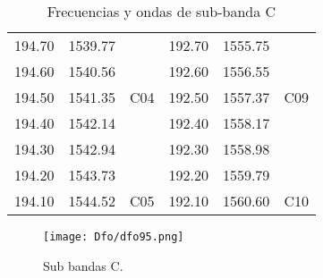 \documentclass[
	12pt, %
	fleqn, %
	a4paper, %
	oneside, %
]{LegrandOrangeBook}
\begin{document}
\begin{table}[H]
{\begin{tabular}{|ccc|ccc|}
\multicolumn{1}{|c|}{194.70}                                   & \multicolumn{1}{c|}{1539.77}                                 &                       & \multicolumn{1}{c|}{192.70}                                   & \multicolumn{1}{c|}{1555.75}                                 &                       \\ \cline{1-2} \cline{4-5}
\multicolumn{1}{|c|}{194.60}                                   & \multicolumn{1}{c|}{1540.56}                                 &                       & \multicolumn{1}{c|}{192.60}                                   & \multicolumn{1}{c|}{1556.55}                                 &                       \\ \cline{1-2} \cline{4-5}
\multicolumn{1}{|c|}{194.50}                                   & \multicolumn{1}{c|}{1541.35}                                 & \multirow{-4}{*}{C04} & \multicolumn{1}{c|}{192.50}                                   & \multicolumn{1}{c|}{1557.37}                                 & \multirow{-4}{*}{C09} \\ \hline
\multicolumn{1}{|c|}{194.40}                                   & \multicolumn{1}{c|}{1542.14}                                 &                       & \multicolumn{1}{c|}{192.40}                                   & \multicolumn{1}{c|}{1558.17}                                 &                       \\ \cline{1-2} \cline{4-5}
\multicolumn{1}{|c|}{194.30}                                   & \multicolumn{1}{c|}{1542.94}                                 &                       & \multicolumn{1}{c|}{192.30}                                   & \multicolumn{1}{c|}{1558.98}                                 &                       \\ \cline{1-2} \cline{4-5}
\multicolumn{1}{|c|}{194.20}                                   & \multicolumn{1}{c|}{1543.73}                                 &                       & \multicolumn{1}{c|}{192.20}                                   & \multicolumn{1}{c|}{1559.79}                                 &                       \\ \cline{1-2} \cline{4-5}
\multicolumn{1}{|c|}{194.10}                                   & \multicolumn{1}{c|}{1544.52}                                 & \multirow{-4}{*}{C05} & \multicolumn{1}{c|}{192.10}                                   & \multicolumn{1}{c|}{1560.60}                                 & \multirow{-4}{*}{C10} \\ \hline
\end{tabular}}
\caption{Frecuencias y ondas de sub-banda C}
\end{table}
\begin{figure}[H]
\centering
\texttt{[image: Dfo/dfo95.png]}
\caption{Sub bandas C.}
\end{figure}
\end{document}
